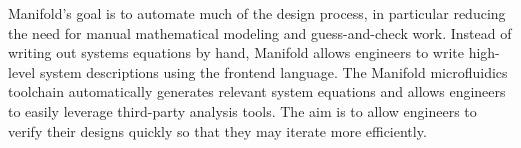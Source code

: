Manifold's goal is to automate much of the design process, in particular reducing the need for manual mathematical modeling and guess-and-check work.
Instead of writing out systems equations by hand, Manifold allows engineers to write high-level system descriptions using the frontend language.
The Manifold microfluidics toolchain automatically generates relevant system equations and allows engineers to easily leverage third-party analysis tools.
The aim is to allow engineers to verify their designs quickly so that they may iterate more efficiently.
